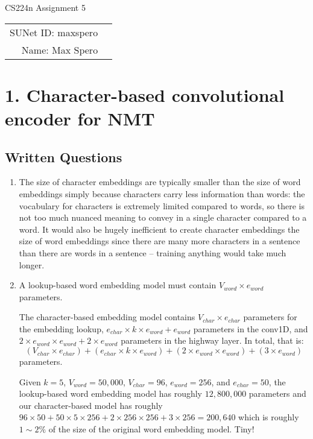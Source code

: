 \documentclass[12pt]{article}
\begin{document}
	
	\begin{center}
		{\Large CS224n Assignment 5 }
		
		\begin{tabular}{rl}
			SUNet ID: maxspero \\
			Name: Max Spero \\
		\end{tabular}
	\end{center}	
	\section*{1. Character-based convolutional encoder for NMT}
	\subsection*{Written Questions}
	\begin{enumerate}[label=\alph*{.}]
	\item	
		The size of character embeddings are typically smaller than the size of word embeddings simply because characters carry less information than words: the vocabulary for characters is extremely limited compared to words, so there is not too much nuanced meaning to convey in a single character compared to a word. It would also be hugely inefficient to create character embeddings the size of word embeddings since there are many more characters in a sentence than there are words in a sentence -- training anything would take much longer.
		
	\item
		A lookup-based word embedding model must contain $V_{word} \times e_{word}$ parameters. 
		
		The character-based embedding model contains $V_{char} \times e_{char}$ parameters for the embedding lookup, $e_{char} \times k \times e_{word} + e_{word}$ parameters in the conv1D, and $2 \times e_{word} \times e_{word} + 2 \times e_{word}$ parameters in the highway layer. In total, that is:
		$$(V_{char} \times e_{char}) + (e_{char} \times k \times e_{word}) + (2 \times e_{word} \times e_{word} )+ (3 \times e_{word})$$
		parameters.
		
		Given $k = 5$, $V_{word}=50,000$, $V_{char} = 96$, $e_{word}=256$, and $e_{char}=50$, the lookup-based word embedding model has roughly $12,800,000$ parameters and our character-based model has roughly $96 \times 50 + 50 \times 5 \times 256 + 2 \times 256 \times 256 + 3 \times 256 = 200,640$ which is roughly $1 \sim 2 \%$ of the size of the original word embedding model. Tiny!
		

\end{enumerate}
\end{document}
